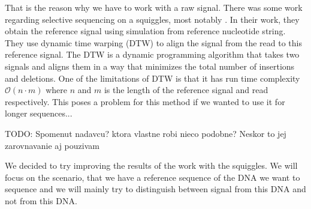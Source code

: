 That is the reason why we have to work with a raw signal. There was some work
regarding selective sequencing on a squiggles, most notably \cite{loose2016real}. In their
work, they obtain the reference signal using simulation from reference nucleotide
string. They use dynamic time warping (DTW) to align the signal from the read to
this reference signal. The DTW is a dynamic programming algorithm that takes two signals and aligns them in a
way that minimizes the total number of insertions and deletions. One of the limitations
of DTW is that it has run time complexity $\mathcal{O}(n\cdot m)$ where $n$ and $m$
is the length of the reference signal and read respectively. This poses a problem
for this method if we wanted to use it for longer sequences...

TODO: Spomenut nadavcu? ktora vlastne robi nieco podobne? Neskor to jej zarovnavanie
aj pouzivam

We decided to try improving the results of the work with the squiggles. We will
focus on the scenario, that we have a reference sequence of the DNA we want to
sequence and we will mainly try to distinguish between signal from this DNA and
not from this DNA.
